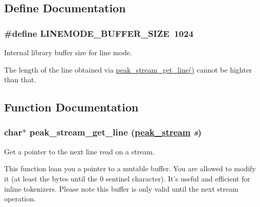 \subsection{Define Documentation}
\hypertarget{group__stream__line_ga3}{
\subsubsection[LINEMODE\_\-BUFFER\_\-SIZE]{\setlength{\rightskip}{0pt plus 5cm}\#define LINEMODE\_\-BUFFER\_\-SIZE\ 1024}}
\label{group__stream__line_ga3}


Internal library buffer size for line mode. 

The length of the line obtained via \hyperlink{group__stream__line_ga44}{peak\_\-stream\_\-get\_\-line()} cannot be highter than that. 

\subsection{Function Documentation}
\hypertarget{group__stream__line_ga2}{
\subsubsection[peak\_\-stream\_\-get\_\-line]{\setlength{\rightskip}{0pt plus 5cm}char$\ast$ peak\_\-stream\_\-get\_\-line (\hyperlink{group__stream_ga0}{peak\_\-stream} {\em s})}}
\label{group__stream__line_ga2}


Get a pointer to the next line read on a stream. 

This function loan you a pointer to a mutable buffer. You are allowed to modify it (at least the bytes until the 0 sentinel character). It's useful and efficient for inline tokenizers. Please note this buffer is only valid until the next stream operation.

